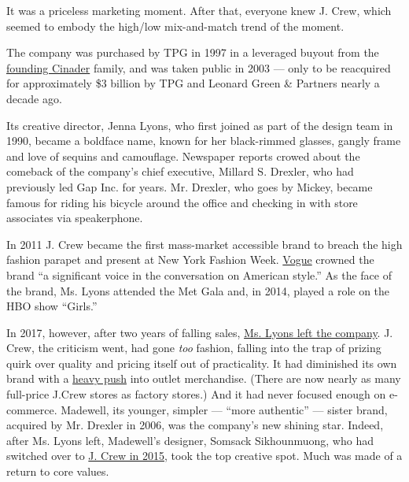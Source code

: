 It was a priceless marketing moment. After that, everyone knew J. Crew,
which seemed to embody the high/low mix-and-match trend of the moment.

The company was purchased by TPG in 1997 in a leveraged buyout from the
\href{https://www.nytimes3xbfgragh.onion/2017/10/17/obituaries/arthur-cinader-who-started-j-crew-avatar-of-preppy-style-dies-at-90.html}{founding
Cinader} family, and was taken public in 2003 --- only to be reacquired
for approximately \$3 billion by TPG and Leonard Green \& Partners
nearly a decade ago.

Its creative director, Jenna Lyons, who first joined as part of the
design team in 1990, became a boldface name, known for her black-rimmed
glasses, gangly frame and love of sequins and camouflage. Newspaper
reports crowed about the comeback of the company's chief executive,
Millard S. Drexler, who had previously led Gap Inc. for years. Mr.
Drexler, who goes by Mickey, became famous for riding his bicycle around
the office and checking in with store associates via speakerphone.

In 2011 J. Crew became the first mass-market accessible brand to breach
the high fashion parapet and present at New York Fashion Week.
\href{https://www.vogue.com/article/and-at-long-last-its-showtime-jcrews-runway-debut-at-new-york-fashion-week}{Vogue}
crowned the brand ``a significant voice in the conversation on American
style.'' As the face of the brand, Ms. Lyons attended the Met Gala and,
in 2014, played a role on the HBO show ``Girls.''

In 2017, however, after two years of falling sales,
\href{https://www.nytimes3xbfgragh.onion/2017/04/04/fashion/j-crew-jenna-lyons.html}{Ms.
Lyons left the company}. J. Crew, the criticism went, had gone
\emph{too} fashion, falling into the trap of prizing quirk over quality
and pricing itself out of practicality. It had diminished its own brand
with a
\href{https://www.buzzfeednews.com/article/sapna/introducing-jcrew-mercantile-the-factory-outlet-that-isnt}{heavy
push} into outlet merchandise. (There are now nearly as many full-price
J.Crew stores as factory stores.) And it had never focused enough on
e-commerce. Madewell, its younger, simpler --- ``more authentic'' ---
sister brand, acquired by Mr. Drexler in 2006, was the company's new
shining star. Indeed, after Ms. Lyons left, Madewell's designer, Somsack
Sikhounmuong, who had switched over to
\href{https://www.nytimes3xbfgragh.onion/2015/06/12/fashion/somsack-sikhounmuong-of-madewell-becomes-womens-wear-designer-at-j-crew.html}{J.
Crew in 2015}, took the top creative spot. Much was made of a return to
core values.

